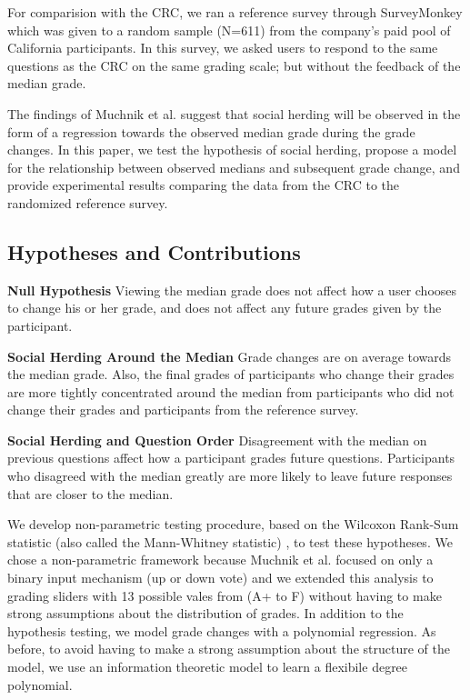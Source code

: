 For comparision with the CRC, we ran a reference survey through SurveyMonkey which was given to a random sample (N=611) from the company's paid pool of California participants.
In this survey, we asked users to respond to the same questions as the CRC on the same grading scale; but without the feedback of the median grade. 

The findings of Muchnik et al. suggest that social herding will be observed in the form of a regression towards the observed median grade during the grade changes.
In this paper, we test the hypothesis of social herding, propose a model for the relationship between observed medians and subsequent grade change, and provide experimental results comparing the data from the CRC to the randomized reference survey.

\subsection{Hypotheses and Contributions}
\noindent \textbf{Null Hypothesis} Viewing the median grade does not affect how a user chooses to change his or her grade, and does not affect any future grades given by the participant.

\noindent \textbf{Social Herding Around the Median} Grade changes are on average towards the median grade. Also, the final grades of participants who change their grades are more tightly concentrated around the median from participants who did not change their grades and participants from the reference survey.

\noindent \textbf{Social Herding and Question Order} Disagreement with the median on previous questions affect how a participant grades future questions. Participants who disagreed with the median greatly are more likely to leave future responses that are closer to the median. 

We develop non-parametric testing procedure, based on the Wilcoxon Rank-Sum statistic (also called the Mann-Whitney statistic) \cite{lehmann2006nonparametrics}, to test these hypotheses.
We chose a non-parametric framework because Muchnik et al. focused on only a binary input mechanism (up or down vote) and we extended this analysis to grading sliders with 13 possible vales from (A+ to F) without having to make strong assumptions about the distribution of grades.
In addition to the hypothesis testing, we model grade changes with a polynomial regression.
As before, to avoid having to make a strong assumption about the structure of the model, we use an information theoretic model to learn a flexibile degree polynomial.

